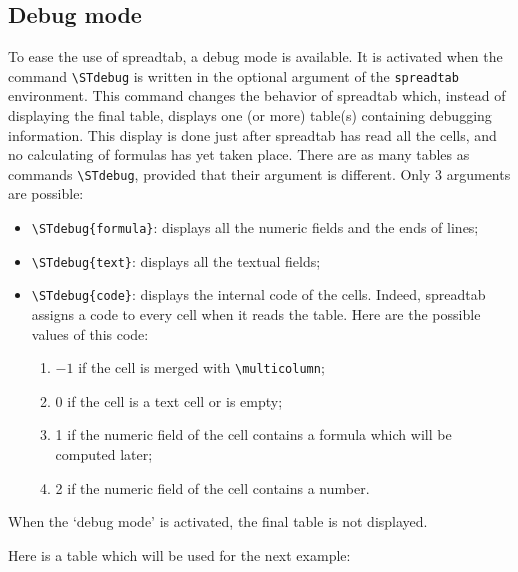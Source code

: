 \documentclass[a4paper,10pt]{article}
\newcommand\verbinline[1][]{\lstinline[breaklines=false,basicstyle=\normalsize\ttfamily,#1]}
\newcommand\ST{\textsf{spreadtab}\xspace}
\begin{document}
\begin{<table environment>}
\subsection{Debug mode}
To ease the use of \ST, a debug mode is available. It is activated when the command \verbinline-\STdebug- is written in the optional argument of the \verbinline-spreadtab- environment. This command changes the behavior of \ST which, instead of displaying the final table, displays one (or more) table(s) containing debugging information. This display is done just after \ST has read all the cells, and no calculating of formulas has yet taken place. There are as many tables as commands \verbinline-\STdebug-, provided that their argument is different. Only 3 arguments are possible:
\begin{itemize}
	\item \verbinline-\STdebug{formula}-: displays all the numeric fields and the ends of lines;
	\item \verbinline-\STdebug{text}-: displays all the textual fields;
	\item \verbinline-\STdebug{code}-: displays the internal code of the cells. Indeed, \ST assigns a code to every cell when it reads the table. Here are the possible values of this code:
	\begin{enumerate}[label=\small\textbullet]
		\item $-1$ if the cell is merged with \verbinline-\multicolumn-;
		\item 0 if the cell is a text cell or is empty;
		\item 1 if the numeric field of the cell contains a formula which will be computed later;
		\item 2 if the numeric field of the cell contains a number.
	\end{enumerate}
\end{itemize}

When the `debug mode' is activated, the final table is not displayed.

Here is a table which will be used for the next example:


\end{<table environment>}
\end{document}
